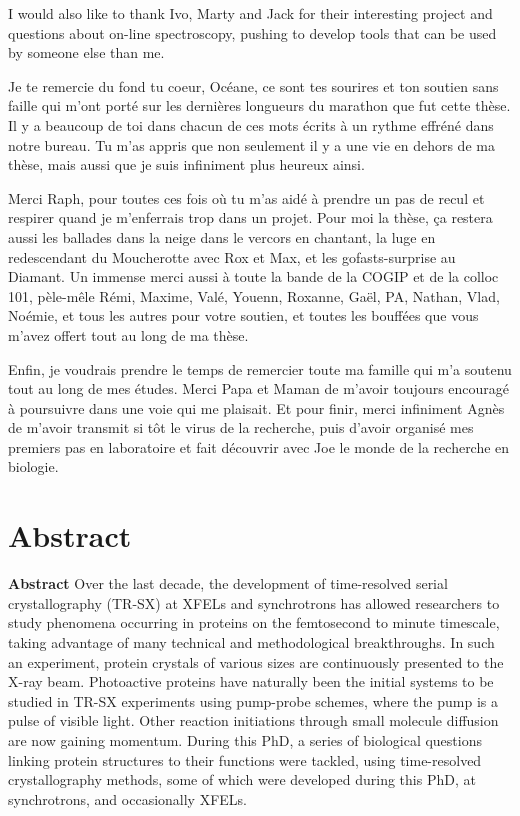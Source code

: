 \documentclass{report}
\renewcommand{\normalsize}{\fontsize{11}{12}\selectfont} %
\begin{document}
I would also like to thank Ivo, Marty and Jack for their interesting project and questions about on-line spectroscopy, pushing to develop tools that can be used by someone else than me. 
 

\vspace{9mm}
Je te remercie du fond tu coeur, Océane, ce sont tes sourires et ton soutien sans faille qui m'ont porté sur les dernières longueurs du marathon que fut cette thèse. Il y a beaucoup de toi dans chacun de ces mots écrits à un rythme effréné dans notre bureau. Tu m’as appris que non seulement il y a une vie en dehors de ma thèse, mais aussi que je suis infiniment plus heureux ainsi.

Merci Raph, pour toutes ces fois où tu m'as aidé à prendre un pas de recul et respirer quand je m'enferrais trop dans un projet. Pour moi la thèse, ça restera aussi les ballades dans la neige dans le vercors en chantant, la luge en redescendant du Moucherotte avec Rox et Max, et les gofasts-surprise au Diamant. Un immense merci aussi à toute la bande de la COGIP et de la colloc 101, pèle-mêle Rémi, Maxime, Valé, Youenn, Roxanne, Gaël, PA, Nathan, Vlad, Noémie, et tous les autres pour votre soutien, et toutes les bouffées  que vous m'avez offert tout au long de ma thèse. 

Enfin, je voudrais prendre le temps de remercier toute ma famille qui m’a soutenu tout au long de mes études. Merci Papa et Maman de m'avoir toujours encouragé à poursuivre dans une voie qui me plaisait. Et pour finir, merci infiniment Agnès de m’avoir transmit si tôt le virus de la recherche, puis d’avoir organisé mes premiers pas en laboratoire et fait découvrir avec Joe le monde de la recherche en biologie.

\pagebreak

\section*{Abstract}

\LARGE\textbf{Abstract}
\normalsize Over the last decade, the development of time-resolved serial crystallography (TR-SX) at XFELs and synchrotrons has allowed researchers to study phenomena occurring in proteins on the femtosecond to minute timescale, taking advantage of many technical and methodological breakthroughs. In such an experiment, protein crystals of various sizes are continuously presented to the X-ray beam. Photoactive proteins have naturally been the initial systems to be studied in TR-SX experiments using pump-probe schemes, where the pump is a pulse of visible light. Other reaction initiations through small molecule diffusion are now gaining momentum. During this PhD, a series of biological questions linking protein structures to their functions were tackled, using time-resolved crystallography methods, some of which were developed during this PhD, at synchrotrons, and occasionally XFELs.
\vspace{10mm}
\end{document}
